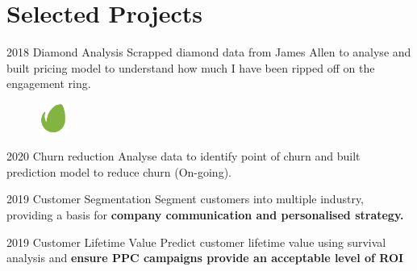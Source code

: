 \documentclass{tccv}
\begin{document}



\section{Selected Projects}

\begin{yearlist}
\item{2018} {Diamond Analysis} {Scrapped diamond data from James Allen
  to analyse and built pricing model to understand how much I have
  been ripped off on the engagement ring.}

  
\end{yearlist}


\begin{figure}[h!] %
  \centering
  \includegraphics[width=1cm,height=1cm]{../company_icon/envato.png}
\end{figure}

\begin{yearlist}

\item{2020} {Churn reduction} {Analyse data to identify point of churn
  and built prediction model to reduce churn (On-going).}
  
\item{2019} {Customer Segmentation} { Segment customers into multiple
  industry, providing a basis for \textbf{company communication and
  personalised strategy.}}

\item{2019} {Customer Lifetime Value} { Predict customer lifetime
  value using survival analysis and \textbf{ensure PPC campaigns
    provide an acceptable level of ROI}}

\end{yearlist}
\end{document}
